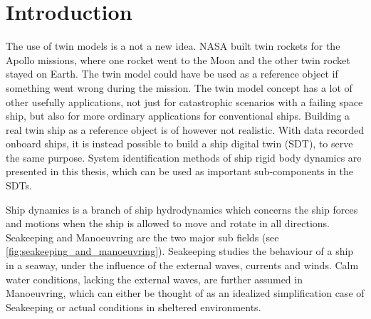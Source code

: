 \chapter{Introduction}
The use of twin models is a not a new idea. NASA built twin rockets for the Apollo missions, where one rocket went to the Moon and the other twin rocket stayed on Earth.
The twin model could have be used as a reference object if something went wrong during the mission.  
The twin model concept has a lot of other usefully applications, not just for catastrophic scenarios with a failing space ship, but also for more ordinary applications for conventional ships. Building a real twin ship as a reference object is of however not realistic. With data recorded onboard ships, it is instead possible to build a ship digital twin (SDT), to serve the same purpose.
System identification methods of ship rigid body dynamics are presented in this thesis, which can be used as important sub-components in the SDTs. 

Ship dynamics is a branch of ship hydrodynamics which concerns the ship forces and motions when the ship is allowed to move and rotate in all directions. Seakeeping and Manoeuvring are the two major sub fields (see \autoref{fig:seakeeping_and_manoeuvring}). Seakeeping studies the  behaviour of a ship in a seaway, under the influence of the external waves, currents and winds. Calm water conditions, lacking the external waves, are further assumed in Manoeuvring, which can either be thought of as an idealized simplification case of Seakeeping or actual conditions in sheltered environments. 

